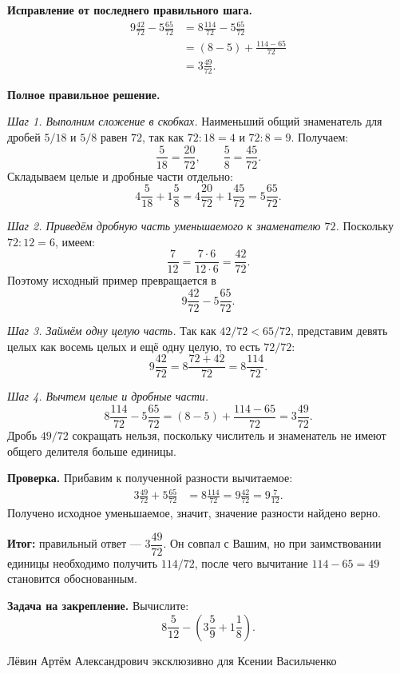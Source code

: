 \documentclass[11pt,a4paper]{article}
\begin{document}
\textbf{Исправление от последнего правильного шага.}
\[
\begin{aligned}
9\frac{42}{72}-5\frac{65}{72}
 &=8\frac{114}{72}-5\frac{65}{72}\\
 &=(8-5)+\frac{114-65}{72}\\
 &=3\frac{49}{72}.
\end{aligned}
\]

\textbf{Полное правильное решение.}

\emph{Шаг 1. Выполним сложение в скобках.} Наименьший общий знаменатель для дробей $5/18$ и $5/8$ равен $72$, так как $72:18=4$ и $72:8=9$. Получаем:
\[
\frac{5}{18}=\frac{20}{72},\qquad
\frac{5}{8}=\frac{45}{72}.
\]
Складываем целые и дробные части отдельно:
\[
4\frac{5}{18}+1\frac{5}{8}
=4\frac{20}{72}+1\frac{45}{72}
=5\frac{65}{72}.
\]

\emph{Шаг 2. Приведём дробную часть уменьшаемого к знаменателю $72$.} Поскольку $72:12=6$, имеем:
\[
\frac{7}{12}=\frac{7\cdot6}{12\cdot6}=\frac{42}{72}.
\]
Поэтому исходный пример превращается в
\[
9\frac{42}{72}-5\frac{65}{72}.
\]

\emph{Шаг 3. Займём одну целую часть.} Так как $42/72<65/72$, представим девять целых как восемь целых и ещё одну целую, то есть $72/72$:
\[
9\frac{42}{72}=8\frac{72+42}{72}=8\frac{114}{72}.
\]

\emph{Шаг 4. Вычтем целые и дробные части.}
\[
8\frac{114}{72}-5\frac{65}{72}
=(8-5)+\frac{114-65}{72}
=3\frac{49}{72}.
\]
Дробь $49/72$ сокращать нельзя, поскольку числитель и знаменатель не имеют общего делителя больше единицы.

\textbf{Проверка.} Прибавим к полученной разности вычитаемое:
\[
\begin{aligned}
3\frac{49}{72}+5\frac{65}{72}
 &=8\frac{114}{72}
 =9\frac{42}{72}
 =9\frac{7}{12}.
\end{aligned}
\]
Получено исходное уменьшаемое, значит, значение разности найдено верно.

\textbf{\textcolor{teal!60!black}{Итог:}} правильный ответ --- $3\dfrac{49}{72}$. Он совпал с Вашим, но при заимствовании единицы необходимо получить $114/72$, после чего вычитание $114-65=49$ становится обоснованным.

\medskip
\textbf{Задача на закрепление.}
Вычислите:
\[
8\frac{5}{12}-\left(3\frac{5}{9}+1\frac{1}{8}\right).
\]

\vfill
\begin{center}
{\footnotesize Лёвин Артём Александрович эксклюзивно для Ксении Васильченко}
\end{center}
\end{document}
